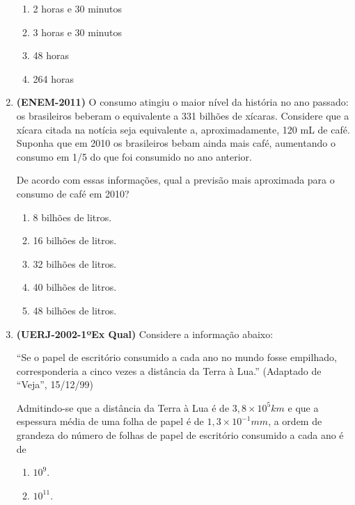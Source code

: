 \begin{enumerate}
\begin{enumerate}
\item {} 
2 horas e 30 minutos

\item {} 
3 horas e 30 minutos

\item {} 
48 horas

\item {} 
264 horas

\end{enumerate}


\item \textbf{(ENEM-2011)} O consumo atingiu o maior nível da história no ano passado: os brasileiros beberam o equivalente a 331 bilhões de xícaras.
Considere que a xícara citada na notícia seja equivalente a, aproximadamente, 120 mL de café. Suponha que em 2010 os brasileiros bebam ainda mais café, aumentando o consumo em 1/5 do que foi consumido no ano anterior.

De acordo com essas informações, qual a previsão mais aproximada para o consumo de café em 2010?
\begin{enumerate}
\item {} 
8 bilhões de litros.

\item {} 
16 bilhões de litros.

\item {} 
32 bilhões de litros.

\item {} 
40 bilhões de litros.

\item {} 
48 bilhões de litros.

\end{enumerate}

\item \textbf{(UERJ-2002-1ºEx Qual)} Considere a informação abaixo: 

``Se o papel de escritório consumido a cada ano no mundo fosse empilhado, corresponderia a cinco vezes a distância da Terra à Lua.” (Adaptado de “Veja”, 15/12/99)

Admitindo-se que a distância da Terra à Lua é de \(3,8 \times10^5km\) e que a espessura média de uma folha de papel é de \(1,3 \times 10^{-1}mm\), a ordem de grandeza do número de folhas de papel de escritório consumido a cada ano é de

\begin{enumerate}
\item {} 
\(10^9\).

\item {} 
\(10^{11}\).


\end{enumerate}
\end{enumerate}
